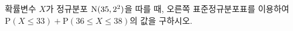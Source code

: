 \noindent\begin{minipage}[t]{0.58\linewidth}\vspace{0pt}\raggedright 확률변수 $X$가 정규분포 $\mathrm{N}(35{,}\mkern3mu\mathopen{}2^2)$을 따를 때, 오른쪽 표준정규분포표를 이용하여 $\mathrm{P}(X\le 33)+\mathrm{P}(36\le X\le 38)$의 값을 구하시오.\end{minipage}\hfill\begin{minipage}[t]{0.4\linewidth}\vspace{0pt}\centering \resizebox{\ifdim\width>\linewidth\linewidth\else\width\fi}{!}{}\end{minipage}\par

